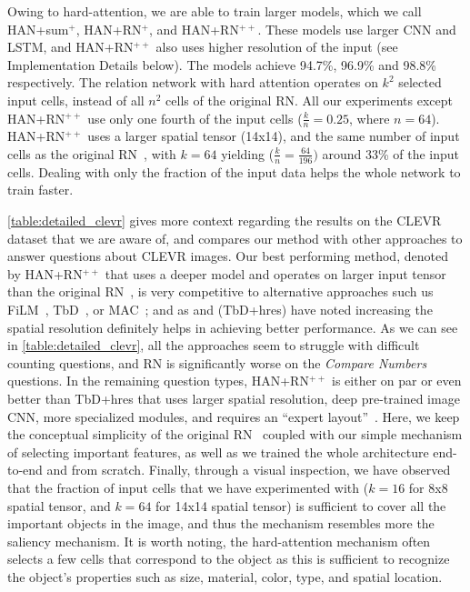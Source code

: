 Owing to hard-attention, we are able to train larger models, which we call HAN+sum$^{+}$, HAN+RN$^{+}$, and HAN+RN$^{++}$.
These models use larger CNN and LSTM, and HAN+RN$^{++}$ also uses higher resolution of the input (see Implementation Details below). The models
achieve 94.7\%, 96.9\% and 98.8\% respectively.
The relation network with hard attention operates on $k^2$ selected input cells, instead of all $n^2$ cells of the original RN. 
All our experiments except HAN+RN$^{++}$ use only one fourth of the input cells ($\frac{k}{n} = 0.25$, where $n = 64$). HAN+RN$^{++}$ uses a larger spatial tensor (14x14), and the same number of input cells as the original RN~\cite{santoro2017simple}, with $k = 64$ yielding ($\frac{k}{n} = \frac{64}{196})$ around 33\% of the input cells. Dealing with only the fraction of the input data helps the whole network to train faster.

\autoref{table:detailed_clevr} gives more context regarding the results on the CLEVR dataset that we are aware of, and compares our method with other approaches to answer questions about CLEVR images. Our best performing method, denoted by HAN+RN$^{++}$ that uses a deeper model and operates on larger input tensor than the original RN~\cite{santoro2017simple}, is very competitive to alternative approaches such us  FiLM~\cite{perez2017film}, TbD~\cite{mascharka2018transparency}, or MAC~\cite{hudson2018compositional}; and as \cite{santoro2017simple} and \cite{mascharka2018transparency} (TbD+hres) have noted increasing the spatial resolution definitely helps in achieving better performance.
As we can see in \autoref{table:detailed_clevr}, all the approaches seem to struggle with difficult counting questions, and RN is significantly worse on the {\it Compare Numbers} questions. In the remaining question types, HAN+RN$^{++}$ is either on par or even better than TbD+hres that uses larger spatial resolution, deep pre-trained image CNN, more specialized modules, and requires an ``expert layout''~\cite{explainable2018eccv}. 
Here, we keep the conceptual simplicity of the original RN~\cite{santoro2017simple} coupled with our simple mechanism of selecting important features, as well as we trained the whole architecture end-to-end and from scratch.
Finally, through a visual inspection, we have observed that the fraction of input cells that we have experimented with ($k=16$ for 8x8 spatial tensor, and $k=64$ for 14x14 spatial tensor) is sufficient to cover all the important objects in the image, and thus the mechanism resembles more the saliency mechanism. It is worth noting, the hard-attention mechanism often selects a few cells that correspond to the object as this is sufficient to recognize the object's properties such as size, material, color, type, and spatial location.


